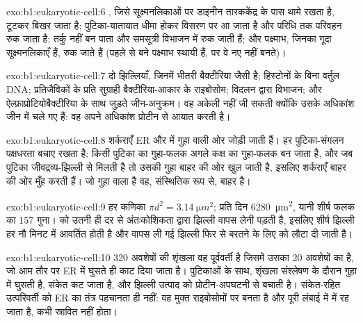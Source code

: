 \begin{solution}{exo:b1:eukaryotic-cell:6}
, जिसे सूक्ष्मनलिकाओं पर डाइनीन तारककेंद्र के पास थामे रखता है,
टूटकर बिखर जाता है; पुटिका-यातायात धीमा होकर विसरण पर आ जाता है और
परिधि तक परिवहन रुक जाता है; तर्कु नहीं बन पाता और  समसूत्री
विभाजन में रुक जाती हैं; और पक्ष्माभ, जिनका गूदा सूक्ष्मनलिकाएँ हैं,
रुक जाते हैं (पहले से बने पक्ष्माभ स्थायी हैं, पर वे नए नहीं बनते)।
\end{solution}

\begin{solution}{exo:b1:eukaryotic-cell:7}
दो झिल्लियाँ, जिनमें भीतरी बैक्टीरिया जैसी है; हिस्टोनों के बिना
वर्तुल DNA; प्रतिजैविकों के प्रति सुग्राही बैक्टीरिया-आकार के राइबोसोम;
विदलन द्वारा विभाजन; और ऐल्फ़ाप्रोटियोबैक्टीरिया के साथ जुड़ते जीन-अनुक्रम।
वह अकेली नहीं जी सकती क्योंकि उसके अधिकांश जीन  में चले गए हैं: वह
अपने अधिकांश प्रोटीन  से आयात करती है।
\end{solution}

\begin{solution}{exo:b1:eukaryotic-cell:8}
शर्कराएँ ER और  में गुहा वाली ओर जोड़ी जाती हैं। हर पुटिका-संगलन
पक्षधरता बचाए रखता है: किसी पुटिका का गुहा-फलक अगले कक्ष का गुहा-फलक बन
जाता है, और जब पुटिका जीवद्रव्य-झिल्ली से मिलती है तो उसकी गुहा बाहर की
ओर खुल जाती है, इसलिए शर्कराएँ बाहर की ओर मुँह करती हैं। जो गुहा वाला है
वह, संस्थितिक रूप से, बाहर है।
\end{solution}

\begin{solution}{exo:b1:eukaryotic-cell:9}
हर कणिका $\pi d^2 = \qty{3.14}{\micro m^2}$; प्रति दिन
\qty{6280}{\micro m^2}, यानी शीर्ष फलक का \qty{157}{} गुना।
 को उतनी ही दर से अंतःकोशिकता द्वारा झिल्ली वापस लेनी पड़ती है,
इसलिए शीर्ष झिल्ली हर नौ मिनट में आवर्तित होती है और वापस ली गई झिल्ली
फिर से बरतने के लिए  को लौटा दी जाती है।
\end{solution}

\begin{solution}{exo:b1:eukaryotic-cell:10}
\qty{320}{} अवशेषों की शृंखला वह पूर्ववर्ती है जिसमें उसका \qty{20}{}
अवशेषों का  है, जो आम तौर पर ER में घुसते ही काट दिया जाता है।
पुटिकाओं के साथ, शृंखला संश्लेषण के दौरान गुहा में घुसती है, संकेत
कट जाता है, और झिल्ली उत्पाद को प्रोटीन-अपघटनी से बचाती है।
संकेत-रहित उत्परिवर्ती को ER का तंत्र पहचानता ही नहीं: वह मुक्त
राइबोसोमों पर बनता है और पूरी लंबाई में  में रह जाता है, कभी
स्रावित नहीं होता।
\end{solution}

